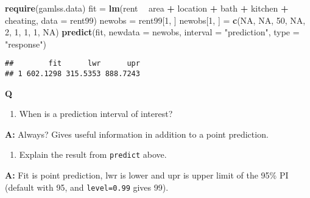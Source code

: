 \documentclass[ignorenonframetext,]{beamer}
\newenvironment{Shaded}{\begin{snugshade}}{\end{snugshade}}
\newcommand{\KeywordTok}[1]{\textcolor[rgb]{0.13,0.29,0.53}{\textbf{#1}}}
\newcommand{\DataTypeTok}[1]{\textcolor[rgb]{0.13,0.29,0.53}{#1}}
\newcommand{\DecValTok}[1]{\textcolor[rgb]{0.00,0.00,0.81}{#1}}
\newcommand{\StringTok}[1]{\textcolor[rgb]{0.31,0.60,0.02}{#1}}
\newcommand{\OtherTok}[1]{\textcolor[rgb]{0.56,0.35,0.01}{#1}}
\newcommand{\OperatorTok}[1]{\textcolor[rgb]{0.81,0.36,0.00}{\textbf{#1}}}
\newcommand{\NormalTok}[1]{#1}
\providecommand{\tightlist}{%
  \setlength{\itemsep}{0pt}\setlength{\parskip}{0pt}}
\begin{document}
\begin{frame}[fragile]

\footnotesize

\begin{Shaded}
\begin{Highlighting}[]
\KeywordTok{require}\NormalTok{(gamlss.data)}
\NormalTok{fit =}\StringTok{ }\KeywordTok{lm}\NormalTok{(rent }\OperatorTok{~}\StringTok{ }\NormalTok{area }\OperatorTok{+}\StringTok{ }\NormalTok{location }\OperatorTok{+}\StringTok{ }\NormalTok{bath }\OperatorTok{+}\StringTok{ }\NormalTok{kitchen }\OperatorTok{+}\StringTok{ }\NormalTok{cheating, }\DataTypeTok{data =}\NormalTok{ rent99)}
\NormalTok{newobs =}\StringTok{ }\NormalTok{rent99[}\DecValTok{1}\NormalTok{, ]}
\NormalTok{newobs[}\DecValTok{1}\NormalTok{, ] =}\StringTok{ }\KeywordTok{c}\NormalTok{(}\OtherTok{NA}\NormalTok{, }\OtherTok{NA}\NormalTok{, }\DecValTok{50}\NormalTok{, }\OtherTok{NA}\NormalTok{, }\DecValTok{2}\NormalTok{, }\DecValTok{1}\NormalTok{, }\DecValTok{1}\NormalTok{, }\DecValTok{1}\NormalTok{, }\OtherTok{NA}\NormalTok{)}
\KeywordTok{predict}\NormalTok{(fit, }\DataTypeTok{newdata =}\NormalTok{ newobs, }\DataTypeTok{interval =} \StringTok{"prediction"}\NormalTok{, }\DataTypeTok{type =} \StringTok{"response"}\NormalTok{)}
\end{Highlighting}
\end{Shaded}

\begin{verbatim}
##        fit      lwr      upr
## 1 602.1298 315.5353 888.7243
\end{verbatim}

\normalsize

\textbf{Q}

\begin{enumerate}
\def\labelenumi{\arabic{enumi}.}
\tightlist
\item
  When is a prediction interval of interest?
\end{enumerate}

\textbf{A:} Always? Gives useful information in addition to a point
prediction.

\begin{enumerate}
\def\labelenumi{\arabic{enumi}.}
\setcounter{enumi}{1}
\tightlist
\item
  Explain the result from \texttt{predict} above.
\end{enumerate}

\textbf{A:} Fit is point prediction, lwr is lower and upr is upper limit
of the 95\% PI (default with 95, and \texttt{level=0.99} gives 99).

\end{frame}
\end{document}
